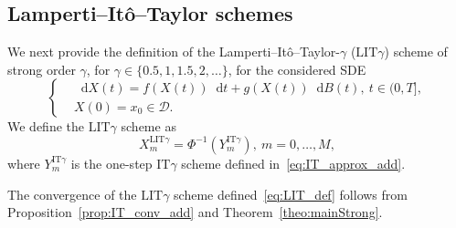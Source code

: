 \documentclass[11pt]{amsart}
\newcommand*\diff{\mathop{}\!\mathrm{d}}
\newcommand{\D}{\mathcal{D}}
\newcommand{\IT}{\textrm{IT}}
\newcommand{\LIT}{\textrm{LIT}}
\begin{document}
{\subsection{Lamperti--Itô--Taylor schemes}\label{sec:LIT_schemes}
We next provide the definition of the Lamperti--Itô--Taylor-$\gamma$ ($\LIT \gamma$) scheme of strong order $\gamma$, for $\gamma \in \{0.5,1,1.5,2,\ldots \}$, for the considered SDE
\begin{equation*}
\left\lbrace
\begin{aligned}
& \diff X(t) = f(X(t)) \diff t + g(X(t)) \diff B(t),\ t \in (0,T], \\ 
& X(0) = x_{0} \in \D.
\end{aligned}
\right.
\end{equation*}
We define the $\LIT \gamma$ scheme as
\begin{equation}\label{eq:LIT_def}
X^{\LIT \gamma}_{m} = \Phi^{-1}(Y^{\IT \gamma}_{m}),\ m=0,\ldots,M,
\end{equation}
where $Y^{\IT \gamma}_{m}$ is the one-step $\IT \gamma$ scheme defined in~\eqref{eq:IT_approx_add}.

The convergence of the $\LIT \gamma$ scheme defined~\eqref{eq:LIT_def} follows from Proposition~\ref{prop:IT_conv_add} and Theorem~\ref{theo:mainStrong}.

}
\end{document}
